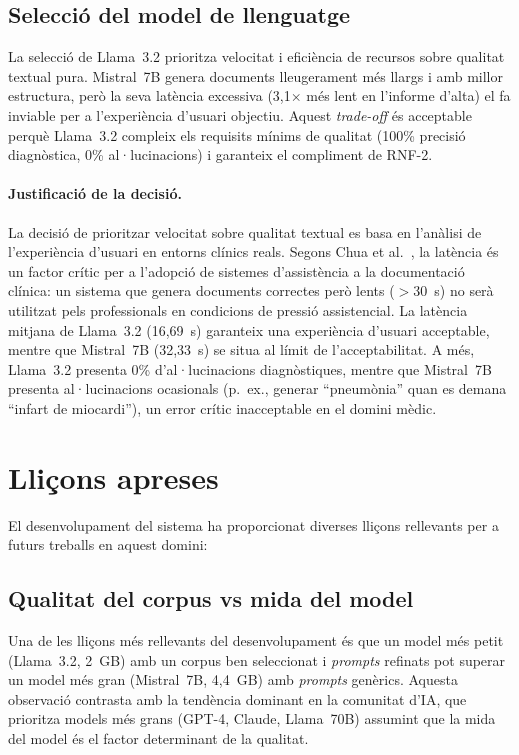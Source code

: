 \documentclass[CAT]{TFUOC}%
\begin{document}
\subsection{Selecció del model de llenguatge}

La selecció de Llama~3.2 prioritza velocitat i eficiència de recursos sobre qualitat textual pura. Mistral~7B genera documents lleugerament més llargs i amb millor estructura, però la seva latència excessiva (3,1$\times$ més lent en l'informe d'alta) el fa inviable per a l'experiència d'usuari objectiu. Aquest \textit{trade-off} és acceptable perquè Llama~3.2 compleix els requisits mínims de qualitat (100\% precisió diagnòstica, 0\% al·lucinacions) i garanteix el compliment de RNF-2.

\paragraph{Justificació de la decisió.}
La decisió de prioritzar velocitat sobre qualitat textual es basa en l'anàlisi de l'experiència d'usuari en entorns clínics reals. Segons Chua et al.~\cite{chua2024discharge}, la latència és un factor crític per a l'adopció de sistemes d'assistència a la documentació clínica: un sistema que genera documents correctes però lents ($>$30~s) no serà utilitzat pels professionals en condicions de pressió assistencial. La latència mitjana de Llama~3.2 (16,69~s) garanteix una experiència d'usuari acceptable, mentre que Mistral~7B (32,33~s) se situa al límit de l'acceptabilitat. A més, Llama~3.2 presenta 0\% d'al·lucinacions diagnòstiques, mentre que Mistral~7B presenta al·lucinacions ocasionals (p.~ex., generar ``pneumònia'' quan es demana ``infart de miocardi''), un error crític inacceptable en el domini mèdic.

\section{Lliçons apreses}

El desenvolupament del sistema ha proporcionat diverses lliçons rellevants per a futurs treballs en aquest domini:

\subsection{Qualitat del corpus vs mida del model}

Una de les lliçons més rellevants del desenvolupament és que un model més petit (Llama~3.2, 2~GB) amb un corpus ben seleccionat i \textit{prompts} refinats pot superar un model més gran (Mistral~7B, 4,4~GB) amb \textit{prompts} genèrics. Aquesta observació contrasta amb la tendència dominant en la comunitat d'IA, que prioritza models més grans (GPT-4, Claude, Llama~70B) assumint que la mida del model és el factor determinant de la qualitat.
\end{document}
